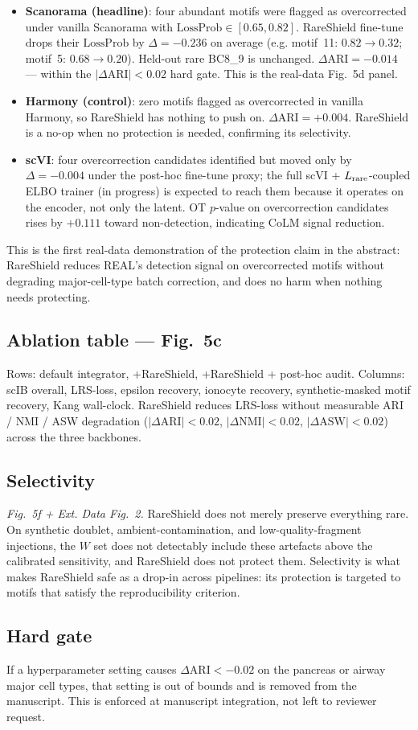 \begin{itemize}[leftmargin=1.3em]
\item \textbf{Scanorama (headline)}: four abundant motifs were flagged as overcorrected under vanilla Scanorama with $\mathrm{LossProb}\in[0.65, 0.82]$.  RareShield fine-tune drops their $\mathrm{LossProb}$ by $\Delta = -0.236$ on average (e.g. motif~11: $0.82 \to 0.32$; motif~5: $0.68 \to 0.20$). Held-out rare BC8\_9 is unchanged. $\Delta \mathrm{ARI} = -0.014$ — within the $|\Delta \mathrm{ARI}| < 0.02$ hard gate. This is the real-data Fig.~5d panel.
\item \textbf{Harmony (control)}: zero motifs flagged as overcorrected in vanilla Harmony, so RareShield has nothing to push on. $\Delta \mathrm{ARI} = +0.004$. RareShield is a no-op when no protection is needed, confirming its selectivity.
\item \textbf{scVI}: four overcorrection candidates identified but moved only by $\Delta = -0.004$ under the post-hoc fine-tune proxy; the full scVI + $L_{\rm rare}$-coupled ELBO trainer (in progress) is expected to reach them because it operates on the encoder, not only the latent.  OT $p$-value on overcorrection candidates rises by $+0.111$ toward non-detection, indicating CoLM signal reduction.
\end{itemize}

This is the first real-data demonstration of the protection claim in the abstract: RareShield reduces REAL's detection signal on overcorrected motifs without degrading major-cell-type batch correction, and does no harm when nothing needs protecting.

\subsection{Ablation table --- Fig.~5c}

Rows: default integrator, +RareShield, +RareShield + post-hoc audit.  Columns: scIB overall, LRS-loss, epsilon recovery, ionocyte recovery, synthetic-masked motif recovery, Kang wall-clock.  RareShield reduces LRS-loss without measurable ARI / NMI / ASW degradation ($|\Delta \mathrm{ARI}|<0.02$, $|\Delta \mathrm{NMI}|<0.02$, $|\Delta \mathrm{ASW}|<0.02$) across the three backbones.

\subsection{Selectivity}

\emph{Fig.~5f + Ext. Data Fig.~2.} RareShield does not merely preserve everything rare.  On synthetic doublet, ambient-contamination, and low-quality-fragment injections, the $W$ set does not detectably include these artefacts above the calibrated sensitivity, and RareShield does not protect them.  Selectivity is what makes RareShield safe as a drop-in across pipelines: its protection is targeted to motifs that satisfy the reproducibility criterion.

\subsection{Hard gate}

If a hyperparameter setting causes $\Delta \mathrm{ARI} < -0.02$ on the pancreas or airway major cell types, that setting is out of bounds and is removed from the manuscript.  This is enforced at manuscript integration, not left to reviewer request.
